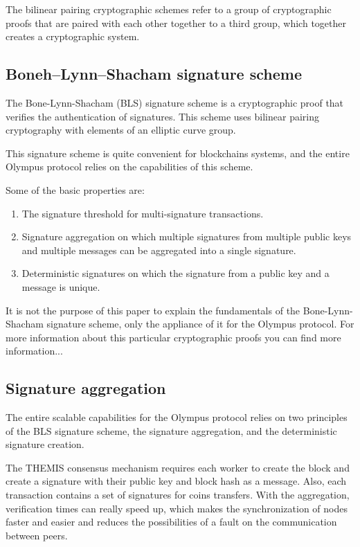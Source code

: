\documentclass{article}
\begin{document}
	The bilinear pairing cryptographic schemes refer to a group of cryptographic proofs that are paired with each other together to a third group, which together creates a cryptographic system.
		
	\subsection{Boneh–Lynn–Shacham signature scheme}	
	
	The Bone-Lynn-Shacham (BLS) signature scheme is a cryptographic proof that verifies the authentication of signatures. This scheme uses bilinear pairing cryptography with elements of an elliptic curve group.
	
	This signature scheme is quite convenient for blockchains systems, and the entire Olympus protocol relies on the capabilities of this scheme.
	
	Some of the basic properties are:
	
		\begin{enumerate}
		\item The signature threshold for multi-signature transactions.
		\item Signature aggregation on which multiple signatures from multiple public keys and multiple messages can be aggregated into a single signature.
		\item Deterministic signatures on which the signature from a public key and a message is unique.
		\end{enumerate}
	
	It is not the purpose of this paper to explain the fundamentals of the Bone-Lynn-Shacham signature scheme, only the appliance of it for the Olympus protocol. For more information about this particular cryptographic proofs you can find more information...
	
	\subsection{Signature aggregation}		
	
	The entire scalable capabilities for the Olympus protocol relies on two principles of the BLS signature scheme, the signature aggregation, and the deterministic signature creation.
	
	The THEMIS consensus mechanism requires each worker to create the block and create a signature with their public key and block hash as a message. Also, each transaction contains a set of signatures for coins transfers. With the aggregation, verification times can really speed up, which makes the synchronization of nodes faster and easier and reduces the possibilities of a fault on the communication between peers.
	
\end{document}
